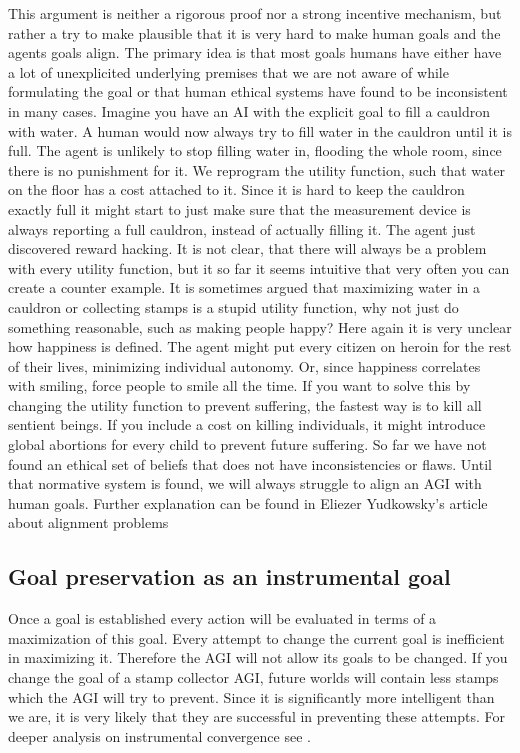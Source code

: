 \documentclass[conference]{IEEEtran}
\begin{document}
This argument is neither a rigorous proof nor a strong incentive mechanism, but rather a try to make plausible that it is very hard to make human goals and the agents goals align. The primary idea is that most goals humans have either have a lot of unexplicited underlying premises that we are not aware of while formulating the goal or that human ethical systems have found to be inconsistent in many cases. Imagine you have an AI with the explicit goal to fill a cauldron with water. A human would now always try to fill water in the cauldron until it is full. The agent is unlikely to stop filling water in, flooding the whole room, since there is no punishment for it. We reprogram the utility function, such that water on the floor has a cost attached to it. Since it is hard to keep the cauldron exactly full it might start to just make sure that the measurement device is always reporting a full cauldron, instead of actually filling it. The agent just discovered reward hacking. It is not clear, that there will always be a problem with every utility function, but it so far it seems intuitive that very often you can create a counter example. It is sometimes argued that maximizing water in a cauldron or collecting stamps is a stupid utility function, why not just do something reasonable, such as making people happy? Here again it is very unclear how happiness is defined. The agent might put every citizen on heroin for the rest of their lives, minimizing individual autonomy. Or, since happiness correlates with smiling, force people to smile all the time. If you want to solve this by changing the utility function to prevent suffering, the fastest way is to kill all sentient beings. If you include a cost on killing individuals, it might introduce global abortions for every child to prevent future suffering. So far we have not found an ethical set of beliefs that does not have inconsistencies or flaws. Until that normative system is found, we will always struggle to align an AGI with human goals. Further explanation can be found in Eliezer Yudkowsky's article about alignment problems \cite{AlignmentYudkowsky2016}


\subsection{Goal preservation as an instrumental goal} 

Once a goal is established every action will be evaluated in terms of a maximization of this goal. Every attempt to change the current goal is inefficient in maximizing it. Therefore the AGI will not allow its goals to be changed. If you change the goal of a stamp collector AGI, future worlds will contain less stamps which the AGI will try to prevent. Since it is significantly more intelligent than we are, it is very likely that they are successful in preventing these attempts. For deeper analysis on instrumental convergence see \cite{InstrumentalConvergenceMiles2018}.
\end{document}
